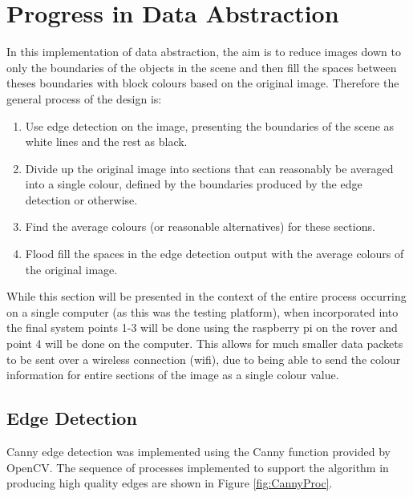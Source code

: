 \chapter{Progress in Data Abstraction}

In this implementation of data abstraction, the aim is to reduce images down to only the boundaries of the objects in the scene and then fill the spaces between theses boundaries with block colours based on the original image. Therefore the general process of the design is:
\begin{enumerate}
    \item Use edge detection on the image, presenting the boundaries of the scene as white lines and the rest as black. 
    \item Divide up the original image into sections that can reasonably be averaged into a single colour, defined by the boundaries produced by the edge detection or otherwise.
    \item Find the average colours (or reasonable alternatives) for these sections.
    \item Flood fill the spaces in the edge detection output with the average colours of the original image.
\end{enumerate}
While this section will be presented in the context of the entire process occurring on a single computer (as this was the testing platform), when incorporated into the final system points 1-3 will be done using the raspberry pi on the rover and point 4 will be done on the computer. This allows for much smaller data packets to be sent over a wireless connection (wifi), due to being able to send the colour information for entire sections of the image as a single colour value.

\section{Edge Detection}

Canny edge detection was implemented using the Canny function provided by OpenCV. The sequence of processes implemented to support the algorithm in producing high quality edges are shown in Figure \ref{fig:CannyProc}. 

